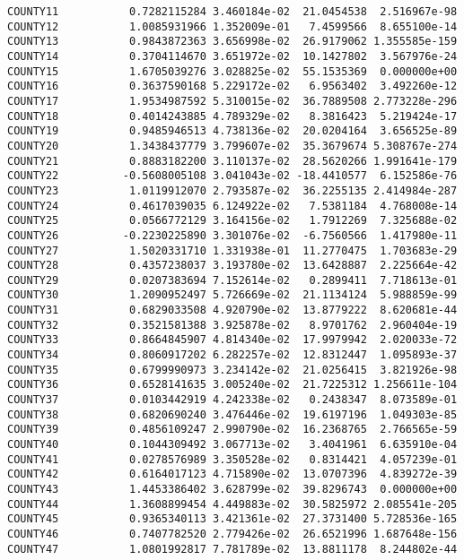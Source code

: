 \documentclass[
  letterpaper,
  DIV=11,
  numbers=noendperiod]{scrartcl}
\begin{document}
\begin{verbatim}
COUNTY11           0.7282115284 3.460184e-02  21.0454538  2.516967e-98
COUNTY12           1.0085931966 1.352009e-01   7.4599566  8.655100e-14
COUNTY13           0.9843872363 3.656998e-02  26.9179062 1.355585e-159
COUNTY14           0.3704114670 3.651972e-02  10.1427802  3.567976e-24
COUNTY15           1.6705039276 3.028825e-02  55.1535369  0.000000e+00
COUNTY16           0.3637590168 5.229172e-02   6.9563402  3.492260e-12
COUNTY17           1.9534987592 5.310015e-02  36.7889508 2.773228e-296
COUNTY18           0.4014243885 4.789329e-02   8.3816423  5.219424e-17
COUNTY19           0.9485946513 4.738136e-02  20.0204164  3.656525e-89
COUNTY20           1.3438437779 3.799607e-02  35.3679674 5.308767e-274
COUNTY21           0.8883182200 3.110137e-02  28.5620266 1.991641e-179
COUNTY22          -0.5608005108 3.041043e-02 -18.4410577  6.152586e-76
COUNTY23           1.0119912070 2.793587e-02  36.2255135 2.414984e-287
COUNTY24           0.4617039035 6.124922e-02   7.5381184  4.768008e-14
COUNTY25           0.0566772129 3.164156e-02   1.7912269  7.325688e-02
COUNTY26          -0.2230225890 3.301076e-02  -6.7560566  1.417980e-11
COUNTY27           1.5020331710 1.331938e-01  11.2770475  1.703683e-29
COUNTY28           0.4357238037 3.193780e-02  13.6428887  2.225664e-42
COUNTY29           0.0207383694 7.152614e-02   0.2899411  7.718613e-01
COUNTY30           1.2090952497 5.726669e-02  21.1134124  5.988859e-99
COUNTY31           0.6829033508 4.920790e-02  13.8779222  8.620681e-44
COUNTY32           0.3521581388 3.925878e-02   8.9701762  2.960404e-19
COUNTY33           0.8664845907 4.814340e-02  17.9979942  2.020033e-72
COUNTY34           0.8060917202 6.282257e-02  12.8312447  1.095893e-37
COUNTY35           0.6799990973 3.234142e-02  21.0256415  3.821926e-98
COUNTY36           0.6528141635 3.005240e-02  21.7225312 1.256611e-104
COUNTY37           0.0103442919 4.242338e-02   0.2438347  8.073589e-01
COUNTY38           0.6820690240 3.476446e-02  19.6197196  1.049303e-85
COUNTY39           0.4856109247 2.990790e-02  16.2368765  2.766565e-59
COUNTY40           0.1044309492 3.067713e-02   3.4041961  6.635910e-04
COUNTY41           0.0278576989 3.350528e-02   0.8314421  4.057239e-01
COUNTY42           0.6164017123 4.715890e-02  13.0707396  4.839272e-39
COUNTY43           1.4453386402 3.628799e-02  39.8296743  0.000000e+00
COUNTY44           1.3608899454 4.449883e-02  30.5825972 2.085541e-205
COUNTY45           0.9365340113 3.421361e-02  27.3731400 5.728536e-165
COUNTY46           0.7407782520 2.779426e-02  26.6521996 1.687648e-156
COUNTY47           1.0801992817 7.781789e-02  13.8811178  8.244802e-44

\end{verbatim}
\end{document}
